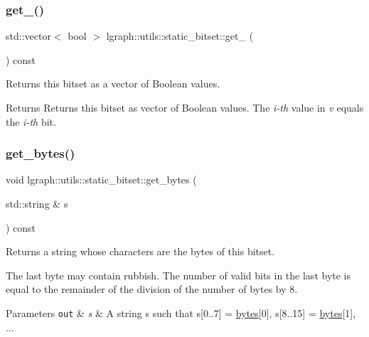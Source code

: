 \subsubsection{\texorpdfstring{get\+\_()}{get\_01()}\hspace{0.1cm}{\footnotesize\ttfamily [4/4]}}
{\footnotesize\ttfamily std\+::vector$<$ bool $>$ lgraph\+::utils\+::static\+\_\+bitset\+::get\+\_ (\begin{DoxyParamCaption}{ }\end{DoxyParamCaption}) const}



Returns this bitset as a vector of Boolean values. 

\begin{DoxyReturn}{Returns}
Returns this bitset as vector of Boolean values. The {\itshape i-\/th} value in {\itshape v} equals the {\itshape i-\/th} bit. 
\end{DoxyReturn}
\mbox{\label{classlgraph_1_1utils_1_1static__bitset_a9df9587947e8bc6aba28ac44f5ad76be}} 
\subsubsection{\texorpdfstring{get\+\_\+bytes()}{get\_bytes()}\hspace{0.1cm}{\footnotesize\ttfamily [1/2]}}
{\footnotesize\ttfamily void lgraph\+::utils\+::static\+\_\+bitset\+::get\+\_\+bytes (\begin{DoxyParamCaption}\item[{std\+::string \&}]{s }\end{DoxyParamCaption}) const}



Returns a string whose characters are the bytes of this bitset. 

The last byte may contain rubbish. The number of valid bits in the last byte is equal to the remainder of the division of the number of bytes by 8.


\begin{DoxyParams}[1]{Parameters}
\mbox{\tt out}  & {\em s} & A string \textquotesingle{}s\textquotesingle{} such that s\mbox{[}0..7\mbox{]} = \hyperlink{classlgraph_1_1utils_1_1static__bitset_a56d277fc22bbf71a27fca530a133c9bd}{bytes}\mbox{[}0\mbox{]}, s\mbox{[}8..15\mbox{]} = \hyperlink{classlgraph_1_1utils_1_1static__bitset_a56d277fc22bbf71a27fca530a133c9bd}{bytes}\mbox{[}1\mbox{]}, ... \\
\hline
\end{DoxyParams}
\mbox{\label{classlgraph_1_1utils_1_1static__bitset_a71b6f834e2ba66943008e1382f09ecab}} 
